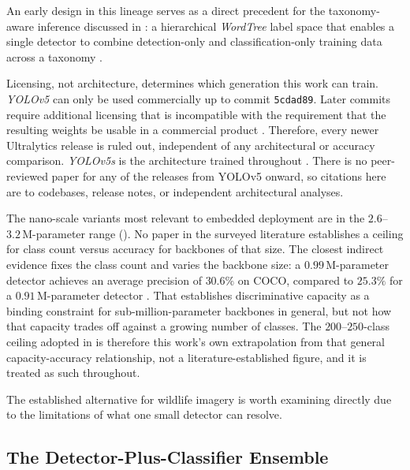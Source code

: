 An early design in this lineage serves as a direct precedent for the taxonomy-aware inference discussed in : a hierarchical \textit{WordTree} label space that enables a single detector to combine detection-only and classification-only training data across a taxonomy \cite{redmonYOLO9000BetterFaster2017}.

Licensing, not architecture, determines which generation this work can train. \textit{YOLOv5} can only be used commercially up to commit \texttt{5cdad89}. Later commits require additional licensing that is incompatible with the requirement that the resulting weights be usable in a commercial product \cite{ultralyticsComprehensiveGuideUltralytics}. Therefore, every newer Ultralytics release is ruled out, independent of any architectural or accuracy comparison. \textit{YOLOv5s} is the architecture trained throughout . There is no peer-reviewed paper for any of the releases from YOLOv5 onward, so citations here are to codebases, release notes, or independent architectural analyses.

The nano-scale variants most relevant to embedded deployment are in the $2.6$--$3.2\,\mathrm{M}$-parameter range (). No paper in the surveyed literature establishes a ceiling for class count versus accuracy for backbones of that size. The closest indirect evidence fixes the class count and varies the backbone size: a $0.99\,\mathrm{M}$-parameter detector achieves an average precision of $30.6\%$ on COCO, compared to $25.3\%$ for a $0.91\,\mathrm{M}$-parameter detector \cite{yuPPPicoDetBetterRealTime2021,geYOLOXExceedingYOLO2021}. That establishes discriminative capacity as a binding constraint for sub-million-parameter backbones in general, but not how that capacity trades off against a growing number of classes. The $200$--$250$-class ceiling adopted in  is therefore this work's own extrapolation from that general capacity-accuracy relationship, not a literature-established figure, and it is treated as such throughout.

The established alternative for wildlife imagery is worth examining directly due to the limitations of what one small detector can resolve.

\subsection{The Detector-Plus-Classifier Ensemble}\label{sec:lit_md_speciesnet}\label{sec:lit_yolo_vs_ensemble}

